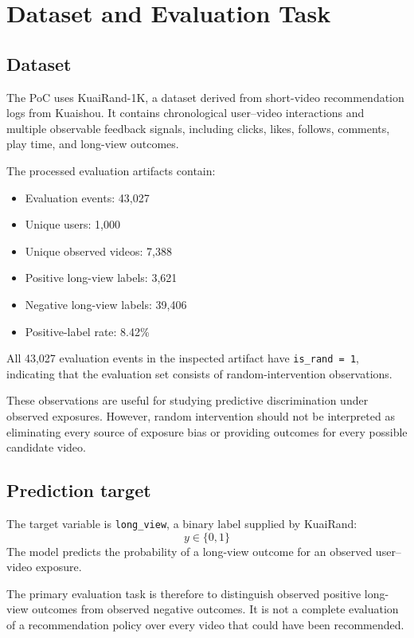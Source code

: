 \documentclass[11pt,a4paper]{article}
\begin{document}
\section{Dataset and Evaluation Task}
\subsection{Dataset}
The PoC uses KuaiRand-1K, a dataset derived from short-video recommendation logs from Kuaishou. It contains chronological user--video interactions and multiple observable feedback signals, including clicks, likes, follows, comments, play time, and long-view outcomes.

The processed evaluation artifacts contain:
\begin{itemize}
    \item Evaluation events: 43,027
    \item Unique users: 1,000
    \item Unique observed videos: 7,388
    \item Positive long-view labels: 3,621
    \item Negative long-view labels: 39,406
    \item Positive-label rate: 8.42\%
\end{itemize}

All 43,027 evaluation events in the inspected artifact have \texttt{is\_rand = 1}, indicating that the evaluation set consists of random-intervention observations.

These observations are useful for studying predictive discrimination under observed exposures. However, random intervention should not be interpreted as eliminating every source of exposure bias or providing outcomes for every possible candidate video.

\subsection{Prediction target}
The target variable is \texttt{long\_view}, a binary label supplied by KuaiRand:
\begin{equation}
y \in \{0, 1\}
\end{equation}
The model predicts the probability of a long-view outcome for an observed user--video exposure.

The primary evaluation task is therefore to distinguish observed positive long-view outcomes from observed negative outcomes. It is not a complete evaluation of a recommendation policy over every video that could have been recommended.
\end{document}

